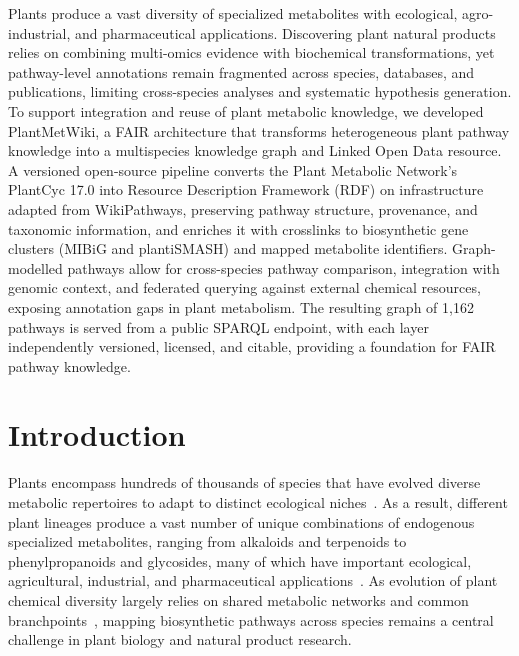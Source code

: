 \documentclass[11pt,a4paper]{article}
\begin{document}
Plants produce a vast diversity of specialized metabolites with ecological,
agro-industrial, and pharmaceutical applications. Discovering plant natural products relies on
combining multi-omics evidence with biochemical transformations, yet pathway-level annotations
remain fragmented across species, databases, and publications, limiting cross-species analyses
and systematic hypothesis generation. To support integration and reuse of plant metabolic
knowledge, we developed PlantMetWiki, a FAIR architecture that transforms heterogeneous plant pathway knowledge into a multispecies knowledge graph and Linked Open Data resource. 
A versioned open-source pipeline converts the Plant Metabolic Network's
PlantCyc 17.0 into Resource Description Framework (RDF) on infrastructure adapted from WikiPathways,
preserving pathway structure, provenance, and taxonomic information, and enriches it with
crosslinks to biosynthetic gene clusters (MIBiG and plantiSMASH) and mapped metabolite identifiers.
Graph-modelled pathways allow for cross-species pathway comparison, integration with genomic context, and federated querying
against external chemical resources, exposing annotation gaps in plant metabolism.
The resulting graph of 1,162 pathways is served from a public SPARQL endpoint, with each layer
independently versioned, licensed, and citable, providing a foundation for FAIR pathway knowledge.

\section*{Introduction}

Plants encompass hundreds of thousands of species that have evolved diverse metabolic repertoires to
adapt to distinct ecological niches~\cite{huang2023}. As a result, different plant lineages produce a
vast number of unique combinations of endogenous specialized metabolites, ranging from alkaloids and
terpenoids to phenylpropanoids and glycosides, many of which have important ecological, agricultural,
industrial, and pharmaceutical applications~\cite{domingo2023,owen2026,greco2026}. As evolution of
plant chemical diversity largely relies on shared metabolic networks and common
branchpoints~\cite{ji2024}, mapping biosynthetic pathways across species remains a central challenge
in plant biology and natural product research.
\end{document}

